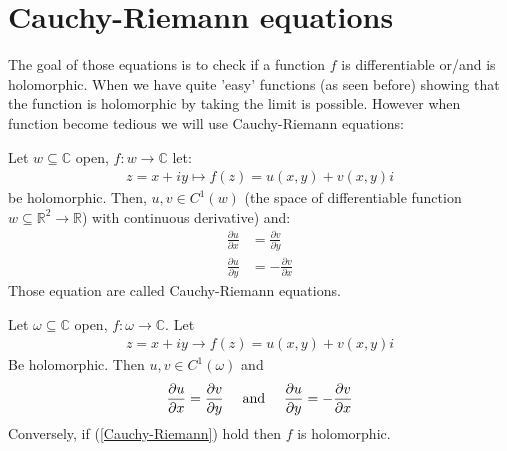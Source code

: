 \section{Cauchy-Riemann equations}
The goal of those equations is to check if a function $f$ is differentiable or/and is holomorphic. When we have quite 'easy' functions (as seen before) showing that the function is holomorphic by taking the limit is possible. However when function become tedious we will use Cauchy-Riemann equations: 
\begin{definition}
Let $w \subseteq \mathbb{C}$ open, $f : w \to \mathbb{C}$ let:
\begin{align*} 
	z = x + iy \mapsto f\left(z\right) =  u\left(x, y\right) + v\left(x, y\right) i
\end{align*}
be holomorphic. Then, $u, v \in C^{1}\left(w\right)$ (the space of differentiable function $w \subseteq \mathbb{R}^{2} \to \mathbb{R}$) with continuous derivative) and:
\begin{align*} 
	\frac{\partial u}{\partial x} &= \frac{\partial v}{\partial y}  \\
	\frac{\partial u}{\partial y}  &= -\frac{\partial v}{\partial x} 
\end{align*}
Those equation are called Cauchy-Riemann equations.
\end{definition}
\begin{theoreme}
	Let $\omega \subseteq \mathbb{C}$ open, $f : \omega \to \mathbb{C}$. Let
	\begin{align*} 
		z = x + iy \to f\left(z\right) = u\left(x, y\right) + v\left(x, y\right)i 
	\end{align*}
	Be holomorphic. Then $u, v \in C^{1}\left(\omega\right)$ and 
	\begin{align}\label{Cauchy-Riemann}
		\frac{\partial u}{\partial x} = \frac{\partial v}{\partial y}\quad \text{ and } \quad\frac{\partial u}{\partial y}  =  - \frac{\partial v}{\partial x} 
	\end{align}
	Conversely, if (\ref{Cauchy-Riemann}) hold then $f$ is holomorphic.
\end{theoreme}

